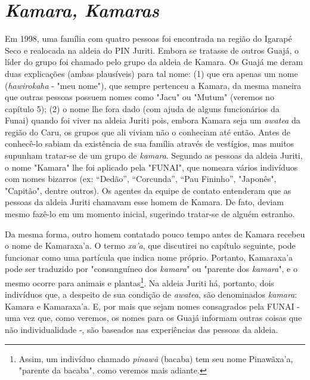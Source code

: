 \section{\emph{Kamara, Kamaras}}

Em 1998, uma família com quatro pessoas foi encontrada na região do
Igarapé Seco e realocada na aldeia do PIN Juriti. Embora se tratasse de
outros Guajá, o líder do grupo foi chamado pelo grupo da aldeia de
Kamara. Os Guajá me deram duas explicações (ambas plausíveis) para tal
nome: (1) que era apenas um nome (\emph{hawirokaha} - "meu nome"), que
sempre pertenceu a Kamara, da mesma maneira que outras pessoas possuem
nomes como "Jacu" ou "Mutum" (veremos no capítulo 5); (2) o nome lhe
fora dado (com ajuda de alguns funcionários da Funai) quando foi viver
na aldeia Juriti pois, embora Kamara seja um \emph{awatea} da região do
Caru, os grupos que ali viviam não o conheciam até então. Antes de
conhecê-lo sabiam da existência de sua família através de vestígios, mas
muitos supunham tratar-se de um grupo de \emph{kamara}. Segundo as
pessoas da aldeia Juriti, o nome "Kamara" lhe foi aplicado pela "FUNAI",
que nomeara vários indivíduos com nomes bizarros (ex: ``Dedão'',
``Corcunda'', ``Pau Fininho'', "Japonês", "Capitão", dentre outros). Os
agentes da equipe de contato entenderam que as pessoas da aldeia Juriti
chamavam esse homem de Kamara. De fato, deviam mesmo fazê-lo em um
momento inicial, sugerindo tratar-se de alguém estranho.

Da mesma forma, outro homem contatado pouco tempo antes de Kamara
recebeu o nome de Kamaraxa'a. O termo \emph{xa'a}, que discutirei no
capítulo seguinte, pode funcionar como uma partícula que indica nome
próprio. Portanto, Kamaraxa'a pode ser traduzido por "consanguíneo dos
\emph{kamara}" ou "parente dos \emph{kamara}", e o mesmo ocorre para
animais e plantas\footnote{Assim, um indivíduo chamado \emph{pinawã}
  (bacaba) tem seu nome Pinawãxa'a, "parente da bacaba", como veremos
  mais adiante.}. Na aldeia Juriti há, portanto, dois indivíduos que, a
despeito de sua condição de \emph{awatea}, são denominados
\emph{kamara}: Kamara e Kamaraxa'a. E, por mais que sejam nomes
consagrados pela FUNAI - uma vez que, como veremos, os nomes para os
Guajá informam outras coisas que não individualidade -, são baseados nas
experiências das pessoas da aldeia.

